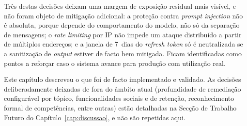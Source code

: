 Três destas decisões deixam uma margem de exposição residual mais visível, e não foram objeto de mitigação adicional: a proteção contra \textit{prompt injection} não é absoluta, porque depende do comportamento do modelo, não só da separação de mensagens; o \textit{rate limiting} por IP não impede um ataque distribuído a partir de múltiplos endereços; e a janela de 7~dias do \textit{refresh token} só é neutralizada se a sanitização de \textit{output} estiver de facto bem mitigada. Ficam identificadas como pontos a reforçar caso o sistema avance para produção com utilização real.

\bigskip

Este capítulo descreveu o que foi de facto implementado e validado. As decisões deliberadamente deixadas de fora do âmbito atual (profundidade de remediação configurável por tópico, funcionalidades sociais e de retenção, reconhecimento formal de competências, entre outras) estão detalhadas na Secção de Trabalho Futuro do Capítulo~\ref{cap:discussao}, e não são repetidas aqui.
